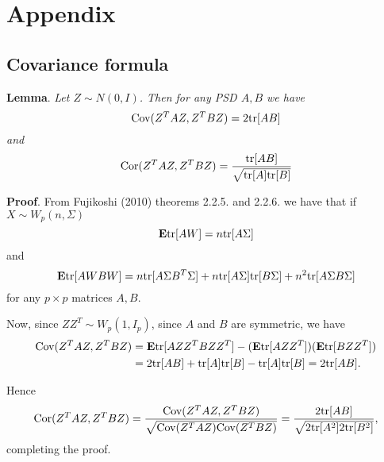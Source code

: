 \documentclass[12pt]{article}
\begin{document}
\section{Appendix}

\subsection{Covariance formula} 

\noindent\textbf{Lemma}. \emph{
Let $Z \sim N(0, I)$.  Then for any PSD $A, B$ we have
\[
\text{Cov}(Z^T A Z, Z^T B Z) = 2\text{tr}[AB]
\]
and
\[
\text{Cor}(Z^TA Z, Z^T B Z) = \frac{\text{tr}[AB]}{\sqrt{\text{tr}[A]\text{tr}[B]}}
\]
}

\textbf{Proof}.
From Fujikoshi (2010) theorems 2.2.5. and 2.2.6. we have that if $X \sim W_p(n, \Sigma)$
\[
\textbf{E}\text{tr}[AW] = n \text{tr}[A\Sigma]
\]
and
\[
\textbf{E}\text{tr}[AWBW] = n\text{tr}[A\Sigma B^T \Sigma] + n\text{tr}[A\Sigma]\text{tr}[B\Sigma] + n^2\text{tr}[A\Sigma B\Sigma]
\]
for any $p \times p$ matrices $A, B$.

Now, since $ZZ^T \sim W_p(1, I_p)$, since $A$ and $B$ are symmetric, we have
\begin{align*}
\text{Cov}(Z^T A Z, Z^T B Z) &= \textbf{E}\text{tr}[AZZ^T BZZ^T] - (\textbf{E}\text{tr}[AZZ^T])(\textbf{E}\text{tr}[BZZ^T])
\\&= 2\text{tr}[AB] + \text{tr}[A]\text{tr}[B] - \text{tr}[A]\text{tr}[B]= 2\text{tr}[AB].
\end{align*}

Hence
\[
\text{Cor}(Z^T A Z, Z^T B Z) = \frac{\text{Cov}(Z^T A Z, Z^T B Z)}{\sqrt{\text{Cov}(Z^T A Z) \text{Cov}(Z^T B Z)}} = \frac{2\text{tr}[AB]}{\sqrt{2\text{tr}[A^2]2\text{tr}[B^2]}},
\]
completing the proof.
\end{document}

